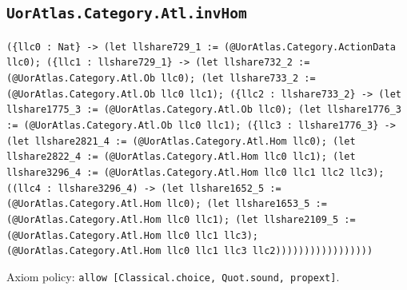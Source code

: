\documentclass[11pt]{article}
\begin{document}
\subsection*{\texttt{UorAtlas.Category.Atl.invHom}}
\noindent\texttt{(\{llc0 : Nat\} -> (let llshare729\_1 := (@UorAtlas.Category.ActionData llc0); (\{llc1 : llshare729\_1\} -> (let llshare732\_2 := (@UorAtlas.Category.Atl.Ob llc0); (let llshare733\_2 := (@UorAtlas.Category.Atl.Ob llc0 llc1); (\{llc2 : llshare733\_2\} -> (let llshare1775\_3 := (@UorAtlas.Category.Atl.Ob llc0); (let llshare1776\_3 := (@UorAtlas.Category.Atl.Ob llc0 llc1); (\{llc3 : llshare1776\_3\} -> (let llshare2821\_4 := (@UorAtlas.Category.Atl.Hom llc0); (let llshare2822\_4 := (@UorAtlas.Category.Atl.Hom llc0 llc1); (let llshare3296\_4 := (@UorAtlas.Category.Atl.Hom llc0 llc1 llc2 llc3); ((llc4 : llshare3296\_4) -> (let llshare1652\_5 := (@UorAtlas.Category.Atl.Hom llc0); (let llshare1653\_5 := (@UorAtlas.Category.Atl.Hom llc0 llc1); (let llshare2109\_5 := (@UorAtlas.Category.Atl.Hom llc0 llc1 llc3); (@UorAtlas.Category.Atl.Hom llc0 llc1 llc3 llc2)))))))))))))))))}\par
\noindent Axiom policy: \texttt{allow [Classical.choice, Quot.sound, propext]}.\par
\end{document}
